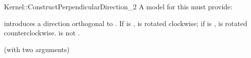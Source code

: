 \begin{ccRefFunctionObjectConcept}{Kernel::ConstructPerpendicularDirection_2}
A model for this must provide:


            {introduces a direction orthogonal to . If  is
             ,  is rotated clockwise; if  is
             ,  is rotated counterclockwise.
             \ccPrecond {} is not .}

\ccRefines
{} (with two arguments)

\ccSeeAlso
{} \\

\end{ccRefFunctionObjectConcept}
